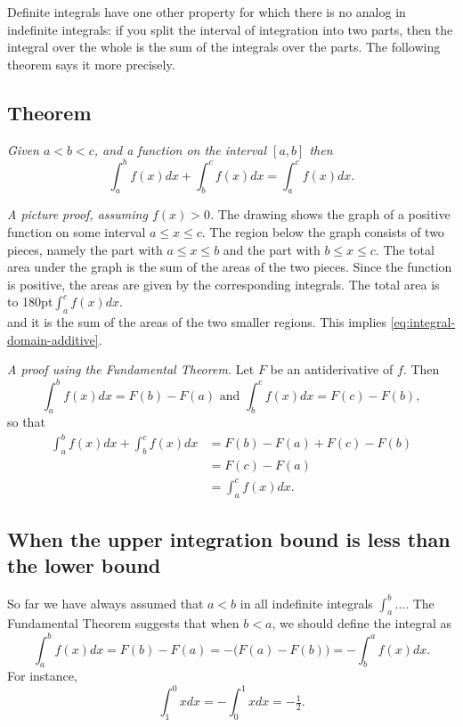 Definite integrals have one other property for which there is no
analog in indefinite integrals: if you split the interval of
integration into two parts, then the integral over the whole is the
sum of the integrals over the parts. The following theorem says it
more precisely.

\subsection{Theorem} %
\itshape
Given $a<b<c$, and a function on the interval $[a,b]$ then
\begin{equation}
  \label{eq:integral-domain-additive}
  \int_a^b f(x)dx + \int_b^c f(x)dx = \int_a^c f(x)dx .
\end{equation}\upshape%


%
\textit{A picture proof, assuming $f(x)>0$. } The drawing shows the
graph of a positive function on some interval $a\leq x\leq c$.  The
region below the graph consists of two pieces, namely the part with
$a\leq x\leq b$ and the part with $b\leq x\leq c$.  The total area
under the graph is the sum of the areas of the two pieces.  Since the
function is positive, the areas are given by the corresponding
integrals.  The total area is\\
\hbox to 180pt{\hspace{60pt}$\displaystyle \int_a^c f(x)dx$.}\\
and it is the sum of the areas of the two smaller regions.  This
implies \eqref{eq:integral-domain-additive}.

\noindent%
\parbox[b][0pt][b]{0.4\textwidth}{ }

\textit{A proof using the Fundamental Theorem. } Let $F$ be an
antiderivative of $f$.  Then
\[
\int_a^b f(x)dx = F(b) - F(a) \text{ and } \int_b^c f(x)dx = F(c) -
F(b),
\]
so that
\begin{align*}
   \int_a^b f(x)dx + \int_b^c f(x)dx   &= F(b) - F(a) + F(c) - F(b) \\
  &= F(c) - F(a) \\
  &=\int_a^c f(x)dx.
\end{align*}

\subsection{When the upper integration bound is less than the lower bound} %
So far we have always assumed that $a<b$ in all indefinite integrals
$\int_a^b \ldots$.  The Fundamental Theorem suggests that when $b<a$,
we should define the integral as
\begin{equation}
  \int_a^bf(x)dx = F(b)-F(a) = -\bigl(F(a)-F(b)\bigr) = -\int_b^a f(x)dx.
\end{equation}
For instance,
\[
\int_1^0 xdx = -\int_0^1 xdx = -\tfrac12.
\]



